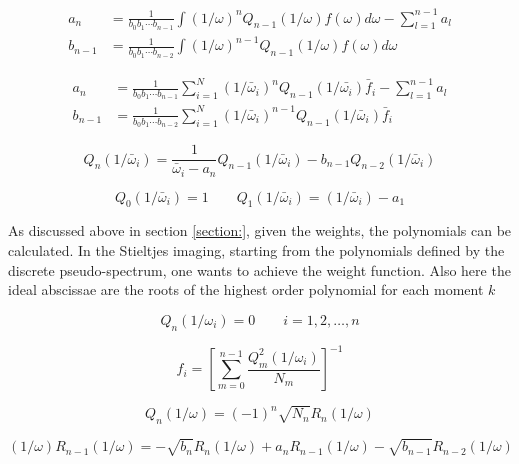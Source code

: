 \begin{align}
  a_n     &= \frac{1}{b_0b_1\cdots b_{n-1}}
             \int (1/\omega)^n Q_{n-1}(1/\omega) f(\omega) d\omega
             - \sum\limits_{l=1}^{n-1} a_l \\
  b_{n-1} &= \frac{1}{b_0b_1\cdots b_{n-2}}
             \int (1/\omega)^{n-1} Q_{n-1}(1/\omega) f(\omega) d\omega
\end{align}

\begin{align}
  a_n     &= \frac{1}{b_0b_1\cdots b_{n-1}}
             \sum\limits_{i=1}^N
               (1/\bar{\omega}_i)^n Q_{n-1}(1/\bar{\omega_i}) \bar{f}_i
             - \sum\limits_{l=1}^{n-1} a_l \\
  b_{n-1} &= \frac{1}{b_0b_1\cdots b_{n-2}}
             \sum\limits_{i=1}^N
               (1/\bar{\omega}_i)^{n-1} Q_{n-1}(1/\bar{\omega}_i) \bar{f}_i
\end{align}

\begin{equation}
  Q_n(1/\bar{\omega}_i) = \frac{1}{\bar{\omega}_i - a_n} Q_{n-1}(1/\bar{\omega}_i)
                          - b_{n-1} Q_{n-2}(1/\bar{\omega}_i)
\end{equation}

\begin{equation}
  Q_0(1/\bar{\omega}_i) = 1 \quad\quad Q_1(1/\bar{\omega}_i) = (1/\bar{\omega}_i) - a_1
\end{equation}


As discussed above in section \ref{section:}, given the weights, the polynomials
can be calculated. In the Stieltjes imaging, starting from the polynomials
defined by the discrete pseudo-spectrum, one wants to achieve the weight function.
Also here the ideal abscissae are the roots of the highest order polynomial
for each moment $k$

\begin{equation}
  Q_n(1/\omega_i) = 0 \quad\quad i = 1,2,\dots ,n
\end{equation}



\begin{equation}
  f_i = \left[ \sum\limits_{m=0}^{n-1} \frac{Q_m^2(1/\omega_i)}{N_m} \right]^{-1}
\end{equation}


\begin{equation}
  Q_n(1/\omega) = (-1)^n \sqrt{N_n} R_n(1/\omega)
\end{equation}

\begin{equation}
  (1/\omega)R_{n-1}(1/\omega) = - \sqrt{b_n}R_n(1/\omega) + a_nR_{n-1}(1/\omega)
                                - \sqrt{b_{n-1}} R_{n-2}(1/\omega)
\end{equation}

